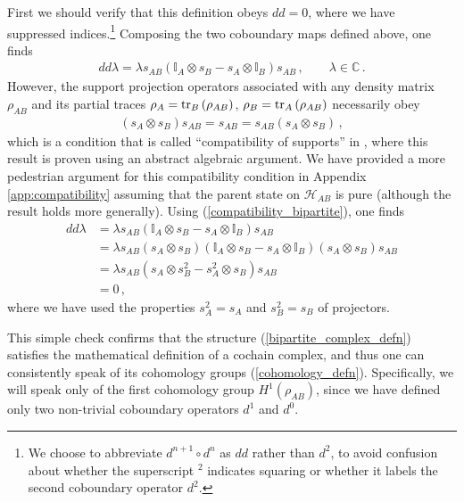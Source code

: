 \documentclass[12pt]{article}
\numberwithin{equation}{section}
\begin{document}
First we should verify that this definition obeys $d d = 0$, where we have suppressed indices.\footnote{We choose to abbreviate $d^{n+1} \circ d^n$ as $d d$ rather than $d^2$, to avoid confusion about whether the superscript ${}^{2}$ indicates squaring or whether it labels the second coboundary operator $d^2$.} Composing the two coboundary maps defined above, one finds
%
\begin{align}
    d d \lambda = \lambda s_{AB} \left( \mathbb{I}_A \otimes s_B - s_A \otimes \mathbb{I}_B \right) s_{AB} \, , \qquad \lambda \in \mathbb{C} \, .
\end{align}
%
However, the support projection operators associated with any density matrix $\rho_{AB}$ and its partial traces $\rho_A = \tr_B \left( \rho_{AB} \right)$, $\rho_B = \tr_A \left( \rho_{AB} \right)$ necessarily obey
%
\begin{align}\label{compatibility_bipartite}
   \left( s_A \otimes s_B \right) s_{AB} = s_{AB} =  s_{AB} \left( s_A \otimes s_B \right) \, ,
\end{align}
%
which is a condition that is called ``compatibility of supports'' in \cite{Mainiero:2019enr}, where this result is proven using an abstract algebraic argument. We have provided a more pedestrian argument for this compatibility condition in Appendix \ref{app:compatibility} assuming that the parent state on $\mathcal{H}_{AB}$ is pure (although the result holds more generally). Using (\ref{compatibility_bipartite}), one finds
%
\begin{align}\label{dd_equals_zero_bipartite}
    d d \lambda &= \lambda s_{AB} \left( \mathbb{I}_A \otimes s_B - s_A \otimes \mathbb{I}_B \right) s_{AB} \nonumber \\
    &= \lambda s_{AB} \left( s_A \otimes s_B \right) \left( \mathbb{I}_A \otimes s_B - s_A \otimes \mathbb{I}_B \right) \left( s_A \otimes s_B \right) s_{AB} \nonumber \\
    &= \lambda s_{AB} \left( s_A \otimes s_B^2 - s_A^2 \otimes s_B \right) s_{AB} \nonumber \\
    &= 0 \, ,
\end{align}
%
where we have used the properties $s_A^2 = s_A$ and $s_B^2 = s_B$ of projectors.

This simple check confirms that the structure (\ref{bipartite_complex_defn}) satisfies the mathematical definition of a cochain complex, and thus one can consistently speak of its cohomology groups (\ref{cohomology_defn}). Specifically, we will speak only of the first cohomology group $H^1 ( \rho_{AB} )$, since we have defined only two non-trivial coboundary operators $d^1$ and $d^0$.
\end{document}
